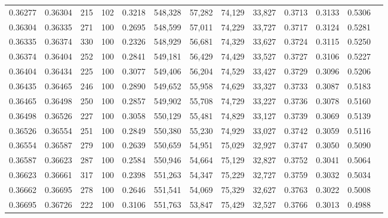 \begin{tabular}{rrrrrrrrrrrrr}
0.36277 & 0.36304 &   215 & 102 &                                     0.3218 & 548,328 &  57,282 &  74,129 &  33,827 & 0.3713 & 0.3133 & 0.5306 \\
0.36304 & 0.36335 &   271 & 100 &                                     0.2695 & 548,599 &  57,011 &  74,229 &  33,727 & 0.3717 & 0.3124 & 0.5281 \\
0.36335 & 0.36374 &   330 & 100 &                                     0.2326 & 548,929 &  56,681 &  74,329 &  33,627 & 0.3724 & 0.3115 & 0.5250 \\
0.36374 & 0.36404 &   252 & 100 &                                     0.2841 & 549,181 &  56,429 &  74,429 &  33,527 & 0.3727 & 0.3106 & 0.5227 \\
0.36404 & 0.36434 &   225 & 100 &                                     0.3077 & 549,406 &  56,204 &  74,529 &  33,427 & 0.3729 & 0.3096 & 0.5206 \\
0.36435 & 0.36465 &   246 & 100 &                                     0.2890 & 549,652 &  55,958 &  74,629 &  33,327 & 0.3733 & 0.3087 & 0.5183 \\
0.36465 & 0.36498 &   250 & 100 &                                     0.2857 & 549,902 &  55,708 &  74,729 &  33,227 & 0.3736 & 0.3078 & 0.5160 \\
0.36498 & 0.36526 &   227 & 100 &                                     0.3058 & 550,129 &  55,481 &  74,829 &  33,127 & 0.3739 & 0.3069 & 0.5139 \\
0.36526 & 0.36554 &   251 & 100 &                                     0.2849 & 550,380 &  55,230 &  74,929 &  33,027 & 0.3742 & 0.3059 & 0.5116 \\
0.36554 & 0.36587 &   279 & 100 &                                     0.2639 & 550,659 &  54,951 &  75,029 &  32,927 & 0.3747 & 0.3050 & 0.5090 \\
0.36587 & 0.36623 &   287 & 100 &                                     0.2584 & 550,946 &  54,664 &  75,129 &  32,827 & 0.3752 & 0.3041 & 0.5064 \\
0.36623 & 0.36661 &   317 & 100 &                                     0.2398 & 551,263 &  54,347 &  75,229 &  32,727 & 0.3759 & 0.3032 & 0.5034 \\
0.36662 & 0.36695 &   278 & 100 &                                     0.2646 & 551,541 &  54,069 &  75,329 &  32,627 & 0.3763 & 0.3022 & 0.5008 \\
0.36695 & 0.36726 &   222 & 100 &                                     0.3106 & 551,763 &  53,847 &  75,429 &  32,527 & 0.3766 & 0.3013 & 0.4988 \\

\end{tabular}
